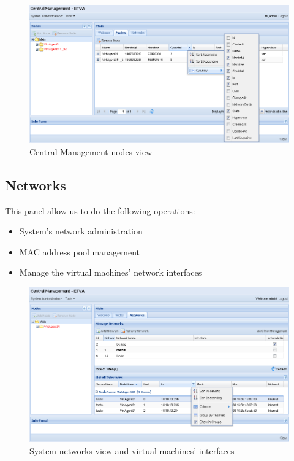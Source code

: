 \begin{figure}[H]
	\begin{center}
	\includegraphics[scale=0.45]{screenshots/main_nodes.png}
	\caption{Central Management nodes view}
	\label{fig:main_nodes}
	\end{center}
\end{figure}

\subsection{Networks}
\label{sub:network}

This panel allow us to do the following operations:

\begin{itemize}
    \item System's network administration
    \item MAC address pool management
    \item Manage the virtual machines' network interfaces
\end{itemize}

\begin{figure}[H]
	\begin{center}
	\includegraphics[scale=0.45]{screenshots/main_networks.png}
	\caption{System networks view and virtual machines' interfaces}
	\label{fig:main_networks}
	\end{center}
\end{figure}


